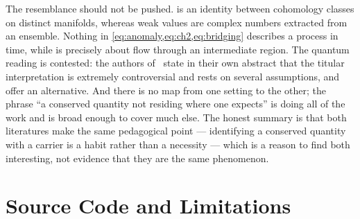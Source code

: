 \documentclass[11pt,a4paper]{article}
\theoremstyle{definition}
\begin{document}
The resemblance should not be pushed.  is an identity between
cohomology classes on distinct manifolds, whereas weak values are complex
numbers extracted from an ensemble. Nothing in
\cref{eq:anomaly,eq:ch2,eq:bridging} describes a process in time, while
\cite{Aharonov2023} is precisely about flow through an intermediate region.
The quantum reading is contested: the authors of~\cite{Waegell2024} state in
their own abstract that the titular interpretation is extremely controversial
and rests on several assumptions, and offer an alternative. And there is no
map from one setting to the other; the phrase ``a conserved quantity not
residing where one expects'' is doing all of the work and is broad enough to
cover much else. The honest summary is that both literatures make the same
pedagogical point --- identifying a conserved quantity with a carrier is a
habit rather than a necessity --- which is a reason to find both interesting,
not evidence that they are the same phenomenon.

\appendix
\small

\section{Source Code and Limitations}
\label{sec:limits}
\end{document}
